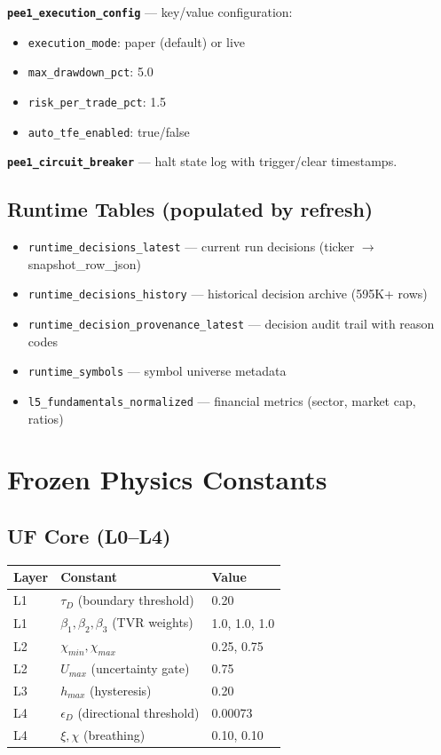 \documentclass[11pt, a4paper]{article}
\begin{document}
\textbf{\texttt{pee1\_execution\_config}} --- key/value configuration:
\begin{itemize}[nosep]
  \item \texttt{execution\_mode}: paper (default) or live
  \item \texttt{max\_drawdown\_pct}: 5.0
  \item \texttt{risk\_per\_trade\_pct}: 1.5
  \item \texttt{auto\_tfe\_enabled}: true/false
\end{itemize}

\textbf{\texttt{pee1\_circuit\_breaker}} --- halt state log with trigger/clear timestamps.

\subsection{Runtime Tables (populated by refresh)}

\begin{itemize}[nosep]
  \item \texttt{runtime\_decisions\_latest} --- current run decisions (ticker $\to$ snapshot\_row\_json)
  \item \texttt{runtime\_decisions\_history} --- historical decision archive (595K+ rows)
  \item \texttt{runtime\_decision\_provenance\_latest} --- decision audit trail with reason codes
  \item \texttt{runtime\_symbols} --- symbol universe metadata
  \item \texttt{l5\_fundamentals\_normalized} --- financial metrics (sector, market cap, ratios)
\end{itemize}

\section{Frozen Physics Constants}

\subsection{UF Core (L0--L4)}

\begin{center}
\begin{tabular}{@{}lll@{}}
\toprule
\textbf{Layer} & \textbf{Constant} & \textbf{Value} \\
\midrule
L1 & $\tau_D$ (boundary threshold) & 0.20 \\
L1 & $\beta_1, \beta_2, \beta_3$ (TVR weights) & 1.0, 1.0, 1.0 \\
L2 & $\chi_{min}, \chi_{max}$ & 0.25, 0.75 \\
L2 & $U_{max}$ (uncertainty gate) & 0.75 \\
L3 & $h_{max}$ (hysteresis) & 0.20 \\
L4 & $\epsilon_D$ (directional threshold) & 0.00073 \\
L4 & $\xi, \chi$ (breathing) & 0.10, 0.10 \\
\bottomrule
\end{tabular}
\end{center}
\end{document}
